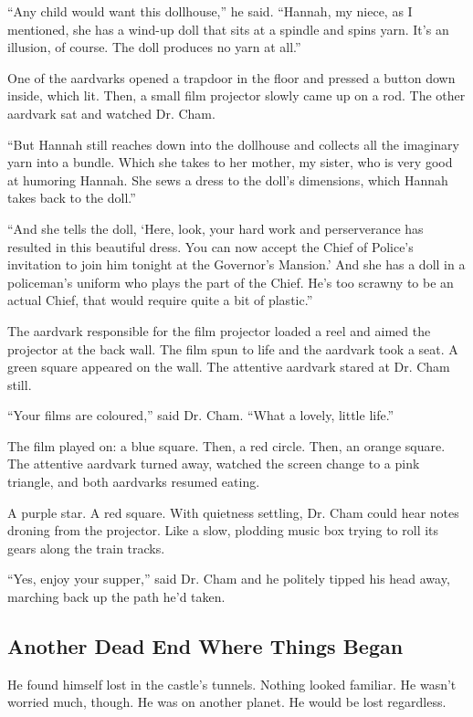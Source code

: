 \documentclass[12pt,twoside]{report}
\begin{document}
``Any child would want this dollhouse,'' he said.  ``Hannah, my niece,
as I mentioned, she has a wind-up doll that sits at a spindle and
spins yarn.  It's an illusion, of course.  The doll produces no yarn
at all.''

One of the aardvarks opened a trapdoor in the floor and pressed a
button down inside, which lit. Then, a small film projector slowly
came up on a rod.  The other aardvark sat and watched Dr. Cham.

``But Hannah still reaches down into the dollhouse and collects all
the imaginary yarn into a bundle.  Which she takes to her mother, my
sister, who is very good at humoring Hannah. She sews a dress to the
doll's dimensions, which Hannah takes back to the doll.''

``And she tells the doll, `Here, look, your hard work and
perserverance has resulted in this beautiful dress. You can now accept
the Chief of Police's invitation to join him tonight at the Governor's
Mansion.'  And she has a doll in a policeman's uniform who plays the
part of the Chief.  He's too scrawny to be an actual Chief, that would
require quite a bit of plastic.''

The aardvark responsible for the film projector loaded a reel and
aimed the projector at the back wall.  The film spun to life and the
aardvark took a seat.  A green square appeared on the wall.  The
attentive aardvark stared at Dr. Cham still.

``Your films are coloured,'' said Dr. Cham.  ``What a lovely, little
life.''

The film played on: a blue square.  Then, a red circle.  Then, an
orange square.  The attentive aardvark turned away, watched the screen
change to a pink triangle, and both aardvarks resumed eating.

A purple star.  A red square.  With quietness settling, Dr. Cham could
hear notes droning from the projector.  Like a slow, plodding music
box trying to roll its gears along the train tracks.

``Yes, enjoy your supper,'' said Dr. Cham and he politely tipped his
head away, marching back up the path he'd taken.



\subsection{Another Dead End Where Things Began}



He found himself lost in the castle's tunnels.  Nothing looked
familiar.  He wasn't worried much, though.  He was on another planet.
He would be lost regardless.
\end{document}
